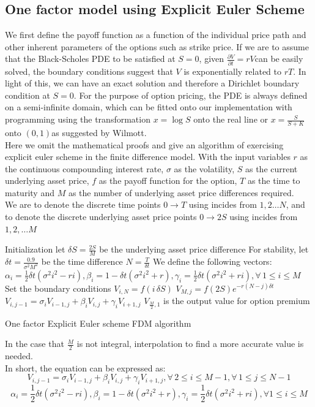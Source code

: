 \subsection{One factor model using Explicit Euler Scheme}
We first define the payoff function as a function of the individual price path and other inherent parameters of the options such as strike price. If we are to assume that the Black-Scholes PDE to be satisfied at $S = 0$, given $\frac{\partial V}{\partial t} = rV$can be easily solved, the boundary conditions suggest that $V$ is exponentially related to $rT$. In light of this, we can have an exact solution and therefore a Dirichlet boundary condition at $S = 0$. For the purpose of option pricing, the PDE is always defined on a semi-infinite domain, which can be fitted onto our implementation with programming using the transformation $x = \log{S}$ onto the real line or $x = \frac{S}{S+K}$ onto $(0, 1)$as suggested by Wilmott.\\[1mm]
Here we omit the mathematical proofs and give an algorithm of exercising explicit euler scheme in the finite difference model. With the input variables $r$ as the continuous compounding interest rate, $\sigma$ as the volatility, $S$ as the current underlying asset price, $f$ as the payoff function for the option, $T$ as the time to maturity and $M$ as the number of underlying asset price differences required.\\
We are to denote the discrete time points $0 \to T$ using incides from $1,2 \dots N$, and to denote the discrete underlying asset price points $0 \to 2S$ using incides from $1,2, \dots M$\\[2mm]
\begin{algorithm}[H]
 Initialization\;
 let $\delta S = \frac{2S}{M}$ be the underlying asset price difference \;
 For stability, let $\delta t = \frac{0.9}{\sigma^{2}M^{2}}$ be the time difference\;
 $N = \frac{T}{\delta t}$\;
 We define the following vectors:\\
 $\alpha_{i} = \frac{1}{2}\delta t(\sigma^{2}i^{2} - ri), \beta_{i} = 1-\delta t(\sigma^{2}i^{2} + r), \gamma_{i} = \frac{1}{2}\delta t(\sigma^{2}i^{2} + ri), \forall \, 1 \le i \le M$\;
 Set the boundary conditions\;
  {
  $V_{i, N} = f(i\,\delta S)$\;
 }
  {
  $V_{M, j} = f(2S)e^{-r(N-j)\delta t}$\;
 }
  {
   {
   $V_{i, j-1} = \sigma_{i}V_{i-1,j} + \beta_{i}V_{i,j} + \gamma_{i}V_{i+1,j} $\;
  }
 }
 $V_{\frac{M}{2},1}$ is the output value for option premium\;
\caption{One factor Explicit Euler scheme FDM algorithm}
\end{algorithm}
In the case that $\frac{M}{2}$ is not integral, interpolation to find a more accurate value is needed.\\[1mm]
In short, the equation can be expressed as:
$$V_{i, j-1} = \sigma_{i}V_{i-1,j} + \beta_{i}V_{i,j} + \gamma_{i}V_{i+1,j},  \forall \,2 \le i \le M-1, \forall \,1 \le j \le N-1$$
$$\alpha_{i} = \frac{1}{2}\delta t(\sigma^{2}i^{2} - ri), \beta_{i} = 1-\delta t(\sigma^{2}i^{2} + r), \gamma_{i} = \frac{1}{2}\delta t(\sigma^{2}i^{2} + ri), \forall 1 \le i \le M$$
\newpage
